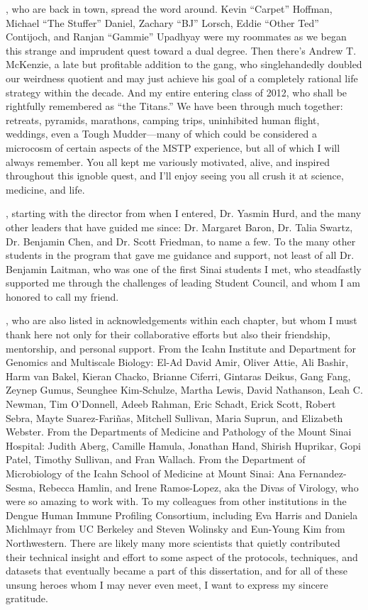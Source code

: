, who are back in town, spread the word around. Kevin ``Carpet'' Hoffman, Michael ``The Stuffer'' Daniel, Zachary ``BJ'' Lorsch, Eddie ``Other Ted'' Contijoch, and Ranjan ``Gammie'' Upadhyay were my roommates as we began this strange and imprudent quest toward a dual degree. Then there's Andrew T. McKenzie, a late but profitable addition to the gang, who singlehandedly doubled our weirdness quotient and may just achieve his goal of a completely rational life strategy within the decade. And my entire entering class of 2012, who shall be rightfully remembered as ``the Titans.'' We have been through much together: retreats, pyramids, marathons, camping trips, uninhibited human flight, weddings, even a Tough Mudder—many of which could be considered a microcosm of certain aspects of the MSTP experience, but all of which I will always remember. You all kept me variously motivated, alive, and inspired throughout this ignoble quest, and I'll enjoy seeing you all crush it at science, medicine, and life.

, starting with the director from when I entered, Dr. Yasmin Hurd, and the many other leaders that have guided me since: Dr. Margaret Baron, Dr. Talia Swartz, Dr. Benjamin Chen, and Dr. Scott Friedman, to name a few. To the many other students in the program that gave me guidance and support, not least of all Dr. Benjamin Laitman, who was one of the first Sinai students I met, who steadfastly supported me through the challenges of leading Student Council, and whom I am honored to call my friend.

, who are also listed in acknowledgements within each chapter, but whom I must thank here not only for their collaborative efforts but also their friendship, mentorship, and personal support. From the Icahn Institute and Department for Genomics and Multiscale Biology: El-Ad David Amir, Oliver Attie, Ali Bashir, Harm van Bakel, Kieran Chacko, Brianne Ciferri, Gintaras Deikus, Gang Fang, Zeynep Gumus, Seunghee Kim-Schulze, Martha Lewis, David Nathanson, Leah C. Newman, Tim O'Donnell, Adeeb Rahman, Eric Schadt, Erick Scott, Robert Sebra, Mayte Suarez-Fariñas, Mitchell Sullivan, Maria Suprun, and Elizabeth Webster. From the Departments of Medicine and Pathology of the Mount Sinai Hospital: Judith Aberg, Camille Hamula, Jonathan Hand, Shirish Huprikar, Gopi Patel, Timothy Sullivan, and Fran Wallach. From the Department of Microbiology of the Icahn School of Medicine at Mount Sinai: Ana Fernandez-Sesma, Rebecca Hamlin, and Irene Ramos-Lopez, aka the Divas of Virology, who were so amazing to work with. To my colleagues from other institutions in the Dengue Human Immune Profiling Consortium, including Eva Harris and Daniela Michlmayr from UC Berkeley and Steven Wolinsky and Eun-Young Kim from Northwestern. There are likely many more scientists that quietly contributed their technical insight and effort to some aspect of the protocols, techniques, and datasets that eventually became a part of this dissertation, and for all of these unsung heroes whom I may never even meet, I want to express my sincere gratitude. 

